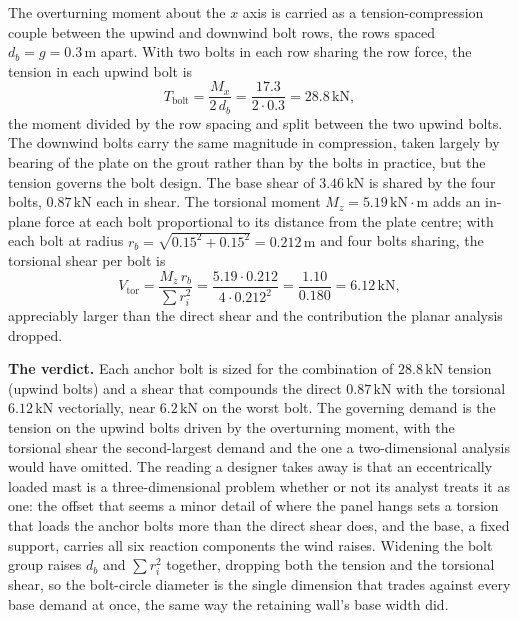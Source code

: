 The overturning moment about
the $x$ axis is carried as a tension-compression couple between the upwind and
downwind bolt rows, the rows spaced $d_b = g = 0.3\,\si{\meter}$ apart. With
two bolts in each row sharing the row force, the tension in each upwind bolt is
\[
T_{\text{bolt}} = \frac{M_x}{2\, d_b}
= \frac{17.3}{2 \cdot 0.3} = 28.8\,\text{kN},
\]
the moment divided by the row spacing and split between the two upwind bolts.
The downwind bolts carry the same magnitude in compression, taken largely by
bearing of the plate on the grout rather than by the bolts in practice, but the
tension governs the bolt design. The base shear of $3.46\,\text{kN}$ is shared
by the four bolts, $0.87\,\text{kN}$ each in shear. The torsional moment
$M_z = 5.19\,\text{kN}\cdot\text{m}$ adds an in-plane force at each bolt
proportional to its distance from the plate centre; with each bolt at radius
$r_b = \sqrt{0.15^2 + 0.15^2} = 0.212\,\si{\meter}$ and four bolts sharing,
the torsional shear per bolt is
\[
V_{\text{tor}} = \frac{M_z\, r_b}{\sum r_i^2}
= \frac{5.19 \cdot 0.212}{4 \cdot 0.212^2}
= \frac{1.10}{0.180} = 6.12\,\text{kN},
\]
appreciably larger than the direct shear and the contribution the planar
analysis dropped.

\textbf{The verdict.} Each anchor bolt is sized for the combination of
$28.8\,\text{kN}$ tension (upwind bolts) and a shear that compounds the direct
$0.87\,\text{kN}$ with the torsional $6.12\,\text{kN}$ vectorially, near
$6.2\,\text{kN}$ on the worst bolt. The governing demand is the tension on the
upwind bolts driven by the overturning moment, with the torsional shear the
second-largest demand and the one a two-dimensional analysis would have
omitted. The reading a designer takes away is that an eccentrically loaded mast
is a three-dimensional problem whether or not its analyst treats it as one:
the offset that seems a minor detail of where the panel hangs sets a torsion
that loads the anchor bolts more than the direct shear does, and the base, a
fixed support, carries all six reaction components the wind raises. Widening
the bolt group raises $d_b$ and $\sum r_i^2$ together, dropping both the
tension and the torsional shear, so the bolt-circle diameter is the single
dimension that trades against every base demand at once, the same way the
retaining wall's base width did.

